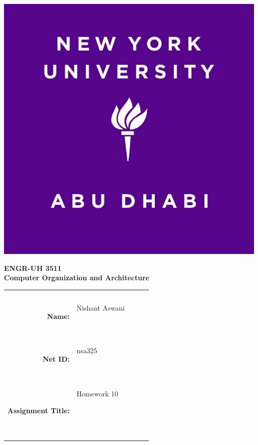 \documentclass[11pt]{exam}
\newcommand{\myname}{Nishant Aswani}
\newcommand{\mynetid}{nsa325}
\newcommand{\myhwtype}{Homework}
\newcommand{\myhwnum}{10}
\newcommand{\mycoursenumber}{ENGR-UH 3511}
\newcommand{\myclassname}{Computer Organization and Architecture}
\begin{document}
\begin{center}
  \includegraphics[scale=0.15]{etc/NYUAD-alt-logo.jpg}
\end{center}

{\vspace{1.5em}}

\begin{center}
    \Huge{\textbf{\mycoursenumber}}\\
    {\vspace{0.5em}}
    \Huge{\textbf{\myclassname}}
\end{center}

{\vspace{10em}}

\begin{center}
  \begin{tabular}{|rp{5.0cm}lll|}
    \hline
    &  &  &  & \\
    &  &  &  & \\
    \Large{\textbf{Name:}} & \Large{\myname}
    
    \  &  &  & \\
    \Large{\textbf{Net ID:}} & \Large{\mynetid}
    
    \  &  &  & \\
    \Large{\textbf{Assignment Title:}} & \Large{\myhwtype{} \myhwnum}
    
    \
    
    \  &  &  & \\
    \hline
  \end{tabular}
\end{center}
\end{document}
